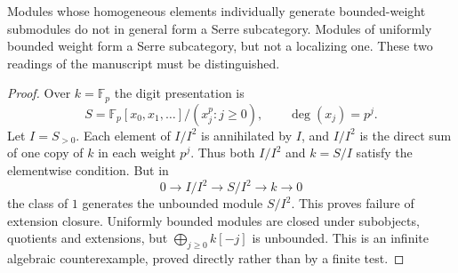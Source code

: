 \begin{proposition}
\label{sa08:D004}
Modules whose homogeneous elements individually generate bounded-weight
submodules do not in general form a Serre subcategory. Modules of
uniformly bounded weight form a Serre subcategory, but not a localizing
one. These two readings of the manuscript must be distinguished.
\end{proposition}
\begin{proof}
Over $k=\mathbb F_p$ the digit presentation is
\[
 S=\mathbb F_p[x_0,x_1,\ldots]/(x_j^p:j\geq0),
 \qquad\deg(x_j)=p^j.
\]
Let $I=S_{>0}$. Each element of $I/I^2$ is annihilated by $I$, and
$I/I^2$ is the direct sum of one copy of $k$ in each weight $p^j$.
Thus both $I/I^2$ and $k=S/I$ satisfy the elementwise condition.
But in
\[
 0\longrightarrow I/I^2\longrightarrow S/I^2\longrightarrow k
 \longrightarrow0
\]
the class of $1$ generates the unbounded module $S/I^2$. This proves
failure of extension closure. Uniformly bounded modules are closed
under subobjects, quotients and extensions, but
$\bigoplus_{j\geq0}k[-j]$ is unbounded. This is an infinite algebraic
counterexample, proved directly rather than by a finite test.
\end{proof}

